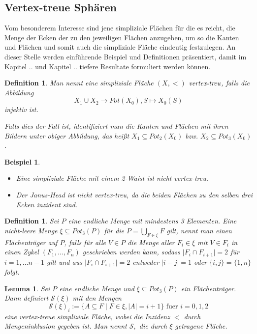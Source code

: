 \documentclass[12pt,titlepage,twoside,cleardoublepage]{article}
\theoremstyle{nummermitklammern}
\newtheorem{lemma}[temp]{Lemma}
\newtheorem{bsp}[temp]{Beispiel}
\newtheorem{definition}[temp]{Definition}
\newtheorem{definition}[zahl]{Definition}
\newtheorem{lemma}[zahl]{Lemma}
\newtheorem{bsp}[zahl]{Beispiel}
\numberwithin{equation}{section}
\begin{document}
\subsection{Vertex-treue Sphären}
Vom besonderem Interesse sind jene simpliziale Flächen für die es reicht, die Menge der Ecken der zu den jeweiligen Flächen anzugeben, um so die Kanten und Flächen und somit auch die simpliziale Fläche eindeutig festzulegen. An dieser Stelle werden einführende Beispiel und Definitionen präsentiert, damit im Kapitel .. und Kapitel .. tiefere Resultate formuliert werden können.
\begin{definition}
Man nennt eine simpliziale Fläche $(X,<)$ $\emph{vertex-treu}$, falls die Abbildung
\[
X_1 \cup X_2 \to Pot(X_0),S \mapsto X_0(S)
\]
 injektiv ist. 

Falls dies der Fall ist, identifiziert man die Kanten und Flächen mit ihren Bildern unter obiger Abbildung, das heißt $X_1 \subseteq Pot_2(X_0)$ bzw. $X_2\subseteq Pot_3(X_0)$. 
\end{definition}
\begin{bsp}
\begin{itemize}
\item Eine simpliziale Fläche mit einem 2-Waist ist nicht vertex-treu.
\item Der Janus-Head ist nicht vertex-treu, da die beiden Flächen zu den selben drei Ecken inzident sind.
\end{itemize}
\end{bsp}
\begin{definition}
Sei $P$ eine endliche Menge mit mindestens 3 Elementen. Eine nicht-leere Menge $\xi \subseteq Pot_3(P)$ für die $P=\bigcup_{F\in \xi} F$ gilt, nennt man einen \emph{Flächenträger} auf $P$, falls für alle $V\in P$ die Menge aller $F_i \in \xi$ mit $V \in F_i$ in einen Zykel  $(F_1,\ldots ,F_n)$ geschrieben werden kann, sodass $\vert F_i \cap F_{i+1}\vert=2 $ für $i=1,\ldots n-1$ gilt und aus $\vert F_i \cap F_{i+1}\vert=2$ entweder $\vert i-j\vert =1$ oder $\{i,j\}=\{1,n\}$ folgt.  
\end{definition}
\begin{lemma}
Sei $P$ eine endliche Menge und $\xi \subseteq Pot_3(P)$ ein Flächenträger. Dann definiert $\mathcal{S}(\xi)$ mit den Mengen 
\[
\mathcal{S}(\xi)_i:=\{A\subseteq F\mid F\in \xi,\vert A\vert=i+1\}\text{ fuer }i=0,1,2 
\]eine vertex-treue simpliziale Fläche, wobei die Inzidenz $<$ durch Mengeninklusion gegeben ist. Man nennt $\mathcal{S},$ die durch $\xi$ getragene Fläche.
\end{lemma}
\end{document}
